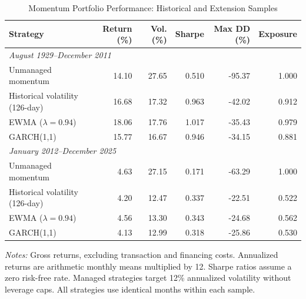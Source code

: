 
\begin{table}[htbp]
\centering
\caption{Momentum Portfolio Performance:
Historical and Extension Samples}
\label{tab:portfolio_performance}
\small
\begin{tabular}{lrrrrr}
\toprule
Strategy & Return (\%) & Vol. (\%) & Sharpe
& Max DD (\%) & Exposure \\
\midrule
\multicolumn{6}{l}{\textit{August 1929--December 2011}} \\
Unmanaged momentum
    & 14.10 & 27.65 & 0.510 & -95.37 & 1.000 \\
Historical volatility (126-day)
    & 16.68 & 17.32 & 0.963 & -42.02 & 0.912 \\
EWMA ($\lambda=0.94$)
    & 18.06 & 17.76 & 1.017 & -35.43 & 0.979 \\
GARCH(1,1)
    & 15.77 & 16.67 & 0.946 & -34.15 & 0.881 \\
\midrule
\multicolumn{6}{l}{\textit{January 2012--December 2025}} \\
Unmanaged momentum
    & 4.63 & 27.15 & 0.171 & -63.29 & 1.000 \\
Historical volatility (126-day)
    & 4.20 & 12.47 & 0.337 & -22.51 & 0.522 \\
EWMA ($\lambda=0.94$)
    & 4.56 & 13.30 & 0.343 & -24.68 & 0.562 \\
GARCH(1,1)
    & 4.13 & 12.99 & 0.318 & -25.86 & 0.530 \\
\bottomrule
\end{tabular}

\vspace{0.2cm}
\begin{minipage}{0.95\textwidth}
\footnotesize
\textit{Notes:} Gross returns, excluding transaction
and financing costs. Annualized returns are arithmetic
monthly means multiplied by 12. Sharpe ratios assume
a zero risk-free rate. Managed strategies target 12\%
annualized volatility without leverage caps.
All strategies use identical months within each sample.
\end{minipage}
\end{table}


